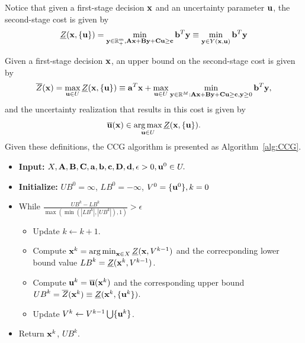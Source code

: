 \documentclass[12pt,x11names]{article}
\theoremstyle{definition}
\newcommand{\real}{\mathbb{R}} %
\newcommand{\ba}{{\bf a}}
\newcommand{\bb}{{\bf b}}
\newcommand{\bc}{{\bf c}}
\newcommand{\bd}{{\bf d}}
\newcommand{\bu}{{\bf u}}
\newcommand{\bx}{{\bf x}}
\newcommand{\by}{{\bf y}}
\newcommand{\bba}{{\bf A}}
\newcommand{\bbb}{{\bf B}}
\newcommand{\bbc}{{\bf C}}
\newcommand{\bbd}{{\bf D}}
\DeclareMathOperator*{\argmax}{arg\,max}
\DeclareMathOperator*{\argmin}{arg\,min}
\begin{document}
Notice that given a first-stage decision $\bx$ and an uncertainty parameter $\bu$, the second-stage cost is given by \begin{equation}\label{eq:SecondStage_Decision}\underline{Z}(\bx,\{\bu\})=\min_{\by\in\real^m_+,\bba\bx+\bbb\by+\bbc\bu\geq \bc} \bb^T\by\equiv \min_{\by\in Y(\bx,\bu)} \bb^T\by \end{equation}

Given a first-stage decision $\bx$, an upper bound on the second-stage cost is given by
\begin{equation}\label{eq:SecondStage_UpperBound}\overline{Z}(\bx)=\max_{\bu\in U} \underline{Z}(\bx,\{\bu\})\equiv \ba^T\bx+ \max_{\bu\in U} \min_{\by\in \real^M:\bba\bx+\bbb\by+\bbc\bu\geq \bc, \by\geq 0} \bb^T\by,\end{equation}
and the uncertainty realization that results in this cost is given by
\begin{equation}\label{eq:SecondStage_WorstCaseRealization}\overline{\bu}(\bx)\in \argmax_{\bu\in U}\underline{Z}(\bx,\{\bu\}).\end{equation}
Given these definitions, the CCG algorithm is presented as Algorithm~\ref{alg:CCG}.

\begin{algorithm}[h]\caption{Column-and-Constraint Generation (CCG)}\label{alg:CCG}
		\begin{itemize}
       		\item[$\rm{(1)}$] {\bf Input:} $X,\bba,\bbb,\bbc,\ba,\bb,\bc,\bbd,\bd, \epsilon>0,\bu^0\in U.$
            \item[$\rm{(2)}$] {\bf Initialize:} ${UB}^0=\infty$, ${LB}^0=-\infty$, $V^0=\{\bu^0\}, k=0$
            \item[$\rm{(3)}$] While $\frac{{UB}^k-{LB}^k}{\max(\min(|{LB}^k|,|{UB}^k|),1)}>\epsilon$
            \begin{itemize}
            \item[$\rm{(a)}$] Update $k\leftarrow k+1$.
            \item[$\rm{(b)}$] Compute $\bx^k=\argmin_{\bx\in X} \underline{Z}(\bx,V^{k-1})$ and the correcponding lower bound value ${LB}^k=\underline{Z}(\bx^k,V^{k-1})$.
            \item[$\rm{(c)}$] Compute $\bu^{k}=\overline{\bu}(\bx^k)$ and the corresponding upper bound ${UB}^k=\overline{Z}(\bx^k)\equiv\underline{Z}(\bx^k,\{\bu^k\})$.
            \item[$\rm{(d)}$] Update $V^{k}\leftarrow V^{k-1}\bigcup\{\bu^{k}\}$.           
            \end{itemize}
            \item[$\rm{(4)}$] Return $\bx^k$, ${UB}^{k}$.
        \end{itemize} 
\vskip 2mm
\end{algorithm}
\end{document}
